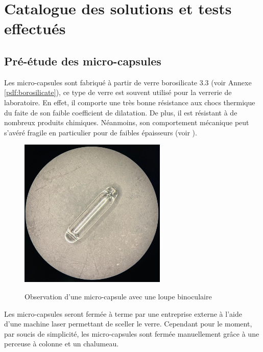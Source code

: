 \section{Catalogue des solutions et tests effectués}
\subsection{Pré-étude des micro-capsules}

Les micro-capsules sont fabriqué à partir de verre borosilicate 3.3 (voir Annexe \ref{pdf:borosilicate}), ce type 
de verre est souvent utilisé pour la verrerie de laboratoire. En effet, il comporte une 
très bonne résistance aux chocs thermique du faite de son faible coefficient de dilatation. 
De plus, il est résistant à de nombreux produits chimiques.
Néanmoins, son comportement mécanique peut s'avéré fragile en particulier pour de faibles
épaisseurs (voir \cite{report_borosilicate}).

\vspace{0.3cm}

\begin{figure}[H]
    \centering
    \includegraphics[width=7cm]{Images/Illustrations/CDH/Micro-capsule.jpg}
    \label{fig:microcapsule_loupe}
    \caption{Observation d'une micro-capsule avec une loupe binoculaire}
\end{figure}

Les micro-capsules seront fermée à terme par une entreprise externe à l'aide d'une machine laser permettant de sceller le verre.
Cependant pour le moment, par soucis de simplicité, les micro-capsules sont fermée manuellement grâce à une 
perceuse à colonne et un chalumeau.

